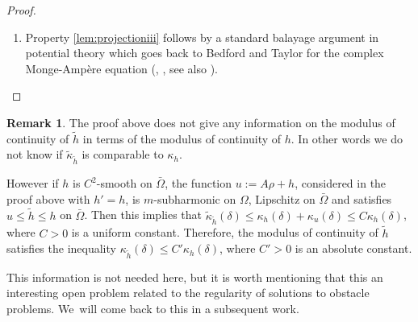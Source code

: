 \documentclass[11pt]{article}
\numberwithin{equation}{section}
\theoremstyle{definition}
\newtheorem{remark}[theorem]{Remark}
\theoremstyle{plain}
\theoremstyle{definition}
\begin{document}
\begin{proof}
\begin{enumerate}
\[\tilde{ h} (z + a) \leq \tilde h (z) + \tilde{\kappa}_{\tilde{h}} (\delta) \leq \tilde h (z) + \tilde{\kappa}_{\tilde{h}} (\delta) + \kappa_h (\delta),
\]
where $ \kappa_h (\delta)$ is the modulus of continuity of $h$ on $\bar{\Omega}$. Therefore, by the gluing principle, the function defined by
\[
v (z):=\begin{cases}
\max \{ \tilde h (z), \tilde h (z + a) - \tilde{\kappa}_{\tilde{h}} (\delta) - \kappa_h (\delta)\} &\hbox{if } z \in\Omega \cap \Omega_a \\
\tilde h (z) &\hbox{if } z \in\Omega\setminus\Omega_a
\end{cases}
\]
is $m$-subharmonic on $\Omega$ and satisfies $v \leq h$ on $\bar \Omega$. Hence $v \leq \tilde h$ on $\bar \Omega$ and then
\[
\tilde h (z + a) - \tilde{\kappa}_{\tilde{h}} (\delta) - \kappa_h (\delta) \leq \tilde h (z),
\]
for any $z \in \Omega \cap \Omega_a$ with $\vert a\vert \leq \delta$. This proves that $\tilde{h}$ is uniformly continuous on $\bar{\Omega}$.

\item
Property \eqref{lem:projectioniii} follows by a standard balayage argument in potential theory which goes back to Bedford and Taylor for the complex Monge-Ampère equation (\cite{BT76}, \cite{BT82}, see also \cite{GLZ19}).\qedhere
\end{enumerate}
\end{proof}

\begin{remark}
The proof above does not give any information on the modulus of continuity of $\tilde h$ in terms of the modulus of continuity of $h$. In other words we do not know if $\tilde{\kappa}_{\tilde h}$ is comparable to $\kappa_h$.

However if $h$ is $C^2$-smooth on $\bar \Omega$, the function $u:= A \rho + h$, considered in the proof above with $h'=h$, is $m$-subharmonic on $\Omega$, Lipschitz on $\bar{\Omega}$ and satisfies $u \leq \tilde{h} \leq h$ on $\bar{\Omega}$.
Then this implies that $\tilde{\kappa}_{\tilde{h}} (\delta) \leq \kappa_h (\delta) + \kappa_u (\delta) \leq C \kappa_h (\delta)$, where $C > 0$ is a uniform constant.
Therefore, the modulus of continuity of $\tilde h$ satisfies the inequality $\kappa_{\tilde h}(\delta) \leq C' \kappa_h(\delta)$,
where $C' > 0$ is an absolute constant.

This information is not needed here, but it is worth mentioning that this an interesting open problem related to the regularity of solutions to obstacle problems.
We~will come back to this in a subsequent work.
\end{remark}
\end{document}
